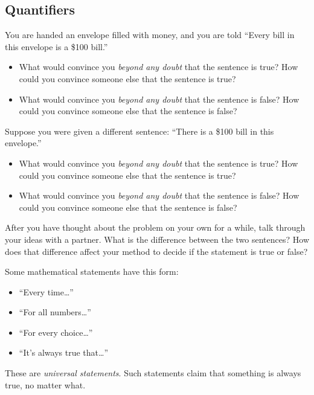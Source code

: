 \subsection{Quantifiers}
\begin{problem}
You are handed an envelope filled with money, and you are told ``Every bill in this envelope is a \$100 bill.''
\begin{itemize}
\item
What would convince you \emph{beyond any doubt} that the sentence is true?  How could you convince someone else that the sentence is true?

\item 
What would convince you \emph{beyond any doubt} that the sentence is false?  How could you convince someone else that the sentence is false?
\end{itemize}

Suppose you were given a different sentence: ``There is a \$100 bill in this envelope.''
\begin{itemize}
\item
What would convince you \emph{beyond any doubt} that the sentence is true?  How could you convince someone else that the sentence is true?

\item 
What would convince you \emph{beyond any doubt} that the sentence is false?  How could you convince someone else that the sentence is false?
\end{itemize}
\end{problem}

\begin{thinkpair*}
After you have thought about the problem on your own for a while, talk through your ideas with a partner.  What is the difference between the two sentences?  How does that difference affect your method to decide if the statement is true or false?
\end{thinkpair*}

Some mathematical statements have this form:
\begin{itemize}
\item
``Every time\dots''
\item
``For all numbers\dots''
\item
``For every choice\dots''
\item
``It's always true that\dots''
\end{itemize} 
These are \emph{universal statements}.  Such statements claim that something is always true, no matter what.  

